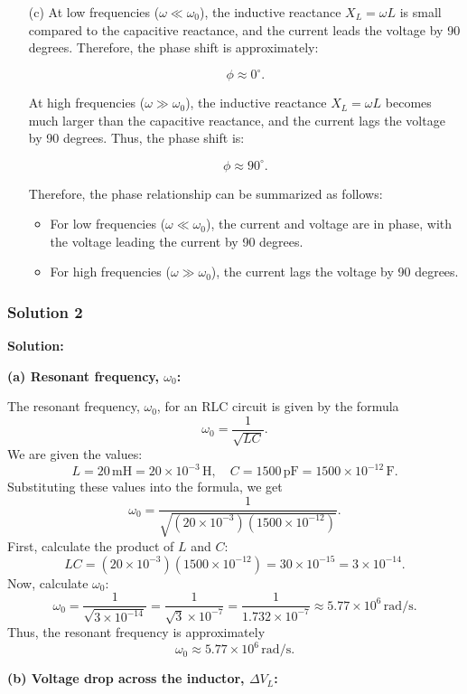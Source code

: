 \documentclass{article}
\begin{document}
\begin{enumerate}
    \item[(c)] At low frequencies ($\omega \ll \omega_0$), the inductive reactance $X_L = \omega L$ is small compared to the capacitive reactance, and the current leads the voltage by 90 degrees. Therefore, the phase shift is approximately:

    \[
    \phi \approx 0^\circ.
    \]

    At high frequencies ($\omega \gg \omega_0$), the inductive reactance $X_L = \omega L$ becomes much larger than the capacitive reactance, and the current lags the voltage by 90 degrees. Thus, the phase shift is:

    \[
    \phi \approx 90^\circ.
    \]

    Therefore, the phase relationship can be summarized as follows:

    \begin{itemize}
        \item For low frequencies ($\omega \ll \omega_0$), the current and voltage are in phase, with the voltage leading the current by 90 degrees.
        \item For high frequencies ($\omega \gg \omega_0$), the current lags the voltage by 90 degrees.
    \end{itemize}
\end{enumerate}


\subsubsection{Solution 2}
\textbf{Solution:}

\textbf{(a) Resonant frequency, $\omega_0$:}

The resonant frequency, $\omega_0$, for an RLC circuit is given by the formula
\[
\omega_0 = \frac{1}{\sqrt{LC}}.
\]
We are given the values:
\[
L = 20\,\mathrm{mH} = 20 \times 10^{-3}\,\mathrm{H}, \quad C = 1500\,\mathrm{pF} = 1500 \times 10^{-12}\,\mathrm{F}.
\]
Substituting these values into the formula, we get
\[
\omega_0 = \frac{1}{\sqrt{(20 \times 10^{-3})(1500 \times 10^{-12})}}.
\]
First, calculate the product of $L$ and $C$:
\[
LC = (20 \times 10^{-3})(1500 \times 10^{-12}) = 30 \times 10^{-15} = 3 \times 10^{-14}.
\]
Now, calculate $\omega_0$:
\[
\omega_0 = \frac{1}{\sqrt{3 \times 10^{-14}}} = \frac{1}{\sqrt{3} \times 10^{-7}} = \frac{1}{1.732 \times 10^{-7}} \approx 5.77 \times 10^6\,\mathrm{rad/s}.
\]
Thus, the resonant frequency is approximately
\[
\omega_0 \approx 5.77 \times 10^6\,\mathrm{rad/s}.
\]

\textbf{(b) Voltage drop across the inductor, $\Delta V_L$:}
\end{document}
